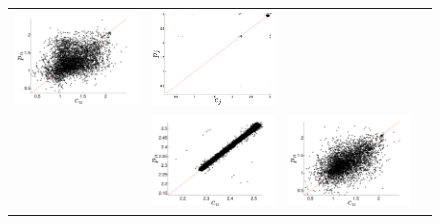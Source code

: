 \begin{figure}
\begin{tabular}{m{}|CCC}
    \includegraphics[width=0.6\columnwidth]{figs/gccARIMAForecast} &
    \includegraphics[width=0.6\columnwidth]{figs/svdfiveARIMAForecast} \\
     &
    \includegraphics[width=0.6\columnwidth]{figs/colLMAForecast} &
    \includegraphics[width=0.6\columnwidth]{figs/gccLMAForecast} &

\end{tabular}
\end{figure}
